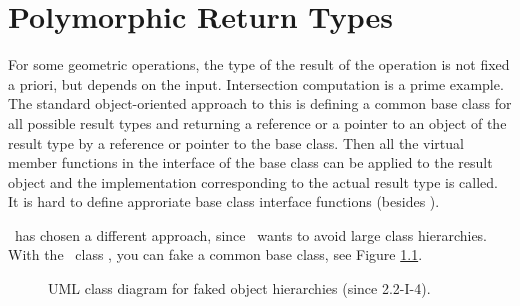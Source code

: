 
\chapter{Polymorphic Return Types}
%
For some geometric operations, the type of the result of the operation
is not fixed a priori, but depends on the input. Intersection computation
is a prime example. The standard object-oriented approach to this is defining
a common base class for all possible result types and returning a reference 
or a pointer to an object of the result type by a reference or pointer to the
base class. Then all the virtual member functions in the interface of 
the base class can be applied to the result object and the implementation
corresponding to the actual result type is called. It is hard to define
approriate base class interface functions (besides ).

\cgal\ has chosen a different approach, since \cgal\ wants to avoid large
class hierarchies. With the \cgal\ 
class , you can fake a common
base class\ccIndexSubitem{base class}{faking}, see Figure \ref{Fig:Object}. 

\begin{figure}[h]
\caption{UML class diagram for faked object hierarchies (since 2.2-I-4).\label{Fig:Object}}
\end{figure}

